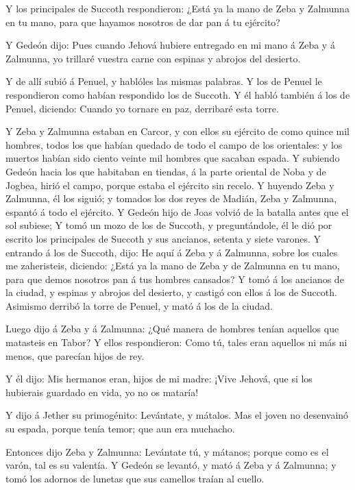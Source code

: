  Y los principales de Succoth respondieron: ¿Está ya la mano
de Zeba y Zalmunna en tu mano, para que hayamos nosotros de dar pan á tu
ejército?

 Y Gedeón dijo: Pues cuando Jehová hubiere entregado en mi
mano á Zeba y á Zalmunna, yo trillaré vuestra carne con espinas y
abrojos del desierto.

 Y de allí subió á Penuel, y hablóles las mismas palabras. Y
los de Penuel le respondieron como habían respondido los de Succoth.
 Y él habló también á los de Penuel, diciendo: Cuando yo
tornare en paz, derribaré esta torre.

 Y Zeba y Zalmunna estaban en Carcor, y con ellos su
ejército de como quince mil hombres, todos los que habían quedado de
todo el campo de los orientales: y los muertos habían sido ciento veinte
mil hombres que sacaban espada.  Y subiendo Gedeón hacia
los que habitaban en tiendas, á la parte oriental de Noba y de Jogbea,
hirió el campo, porque estaba el ejército sin recelo.  Y
huyendo Zeba y Zalmunna, él los siguió; y tomados los dos reyes de
Madián, Zeba y Zalmunna, espantó á todo el ejército.  Y
Gedeón hijo de Joas volvió de la batalla antes que el sol subiese;
 Y tomó un mozo de los de Succoth, y preguntándole, él le
dió por escrito los principales de Succoth y sus ancianos, setenta y
siete varones.  Y entrando á los de Succoth, dijo: He aquí
á Zeba y á Zalmunna, sobre los cuales me zaheristeis, diciendo: ¿Está ya
la mano de Zeba y de Zalmunna en tu mano, para que demos nosotros pan á
tus hombres cansados?  Y tomó á los ancianos de la ciudad,
y espinas y abrojos del desierto, y castigó con ellos á los de Succoth.
 Asimismo derribó la torre de Penuel, y mató á los de la
ciudad.

 Luego dijo á Zeba y á Zalmunna: ¿Qué manera de hombres
tenían aquellos que matasteis en Tabor? Y ellos respondieron: Como tú,
tales eran aquellos ni más ni menos, que parecían hijos de rey.

 Y él dijo: Mis hermanos eran, hijos de mi madre: ¡Vive
Jehová, que si los hubierais guardado en vida, yo no os mataría!

 Y dijo á Jether su primogénito: Levántate, y mátalos. Mas
el joven no desenvainó su espada, porque tenía temor; que aun era
muchacho.

 Entonces dijo Zeba y Zalmunna: Levántate tú, y mátanos;
porque como es el varón, tal es su valentía. Y Gedeón se levantó, y mató
á Zeba y á Zalmunna; y tomó los adornos de lunetas que sus camellos
traían al cuello.

